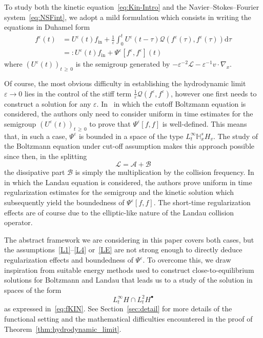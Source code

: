 \documentclass[10pt]{amsart}
\theoremstyle{definition}\newtheorem{defi}[theo]{Definition}\newtheorem{rema}[theo]{Remark}\newtheorem{exam}[theo]{Example}\newtheorem{exem}[theo]{Example}\newtheorem{nota}[theo]{Notation}
\newcommand{\ini}{\mathrm{in}}
\renewcommand{\d}{\mathrm{d}}
\newcommand{\bbH}{\mathbb{H}}
\renewcommand{\AA}{\mathcal{A}}
\newcommand{\BB}{\mathcal{B}}
\newcommand{\LL}{\mathcal{L}}
\newcommand{\QQ}{\mathcal{Q}}
\newcommand{\Ss}{H}
\newcommand{\Ssp}{H^{\bullet}}
\renewcommand*\ge{\geqslant}
\newcommand*\eps{{\varepsilon}}
\begin{document}
To study both the kinetic equation~\eqref{eq:Kin-Intro} and the Navier--Stokes--Fourier system~\eqref{eq:NSFint}, we adopt a mild formulation which consists in writing the equations in Duhamel form
\begin{align*}
f^\eps(t)&=U^\eps(t)f_\ini+\frac{1}{\eps}\int_0^t U^\eps(t-\tau) \QQ\left(f^\eps(\tau),f^\eps(\tau)\right)\d\tau\\
&=:U^\eps(t)f_\ini+\Psi^\eps\left[f^\eps,f^\eps\right](t)
\end{align*}
where $(U^\eps(t))_{t\,\ge\,0}$ is the semigroup generated by $-{\eps^{-2}}\LL - {\eps}^{-1}v\cdot \nabla_x$.

{Of course, the most obvious difficulty in establishing the hydrodynamic limit $\eps \to 0$ lies in the control of the stiff term $\frac{1}{\eps}\QQ(f^\eps,f^\eps)$, however one first needs to construct a solution for any $\eps$.} In~\cite{BU1991, GT2020} in which the cutoff Boltzmann equation is considered, the authors only need to consider uniform in time estimates for the semigroup $(U^\eps(t))_{t\,\ge\,0}$ to prove that $\Psi^\eps[f,f]$ is well-defined. This means that, in such a case, $\Psi^\eps$ is bounded in a space of the type $L^\infty_t\bbH^s_x \Ss_v$. The study of the Boltzmann equation under cut-off assumption makes this approach possible since then, in the splitting
\[
\LL=\AA+\BB
\]
the dissipative part $\BB$ is simply the multiplication by the collision frequency. In~\cite{CRT2022} in which the Landau equation is considered, the authors prove uniform in time regularization estimates for the semigroup and the kinetic solution which subsequently yield the boundedness of $\Psi^\eps[f,f].$ The short-time regularization effects are of course due to the elliptic-like nature of the Landau collision operator.

The abstract framework we are considering in this paper covers both cases, but the assumptions~\eqref{L1}--\eqref{L4} or~\ref{LE} are not strong enough to directly deduce regularization effects and boundedness of $\Psi^\eps$. To overcome this, we draw inspiration from suitable energy methods used to construct close-to-equilibrium solutions for Boltzmann and Landau that leads us to a study of the solution in spaces of the form
\[
L^\infty_t \Ss \cap L^2_t \Ssp
\]
as expressed in~\eqref{eq:fKIN}. See Section~\ref{sec:detail} for more details of the functional setting and the mathematical difficulties encountered in the proof of Theorem~\ref{thm:hydrodynamic_limit}.
\end{document}
